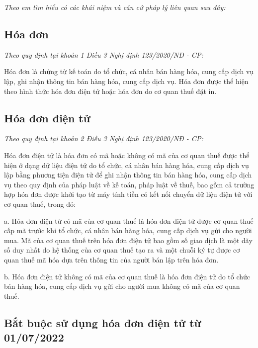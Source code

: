 \emph{Theo em tìm hiểu có các khái niệm và căn cứ pháp lý liên quan sau đây:}

\subsection{Hóa đơn}

\emph{Theo quy định tại khoản 1 Điều 3 Nghị định 123/2020/NĐ - CP:}


Hóa đơn là chứng từ kế toán do tổ chức, cá nhân bán hàng hóa, cung cấp dịch vụ lập, ghi nhận thông tin bán hàng hóa, cung cấp dịch vụ. Hóa đơn được thể hiện theo hình thức hóa đơn điện tử hoặc hóa đơn do cơ quan thuế đặt in.


\subsection{Hóa đơn điện tử}

\emph{Theo quy định tại khoản 2 Điều 3 Nghị định 123/2020/NĐ - CP:}


Hóa đơn điện tử là hóa đơn có mã hoặc không có mã của cơ quan thuế được thể hiện ở dạng dữ liệu điện tử do tổ chức, cá nhân bán hàng hóa, cung cấp dịch vụ lập bằng phương tiện điện tử để ghi nhận thông tin bán hàng hóa, cung cấp dịch vụ theo quy định của pháp luật về kế toán, pháp luật về thuế, bao gồm cả trường hợp hóa đơn được khởi tạo từ máy tính tiền có kết nối chuyển dữ liệu điện tử với cơ quan thuế, trong đó:

a. Hóa đơn điện tử có mã của cơ quan thuế là hóa đơn điện tử được cơ quan thuế cấp mã trước khi tổ chức, cá nhân bán hàng hóa, cung cấp dịch vụ gửi cho người mua. Mã của cơ quan thuế trên hóa đơn điện tử bao gồm số giao dịch là một dãy số duy nhất do hệ thống của cơ quan thuế tạo ra và một chuỗi ký tự được cơ quan thuế mã hóa dựa trên thông tin của người bán lập trên hóa đơn.

b. Hóa đơn điện tử không có mã của cơ quan thuế là hóa đơn điện tử do tổ chức bán hàng hóa, cung cấp dịch vụ gửi cho người mua không có mã của cơ quan thuế.


\subsection{Bắt buộc sử dụng hóa đơn điện tử từ 01/07/2022}

